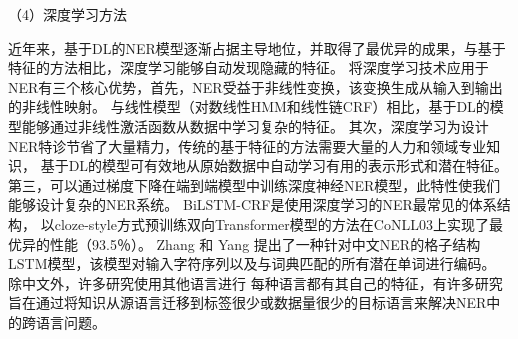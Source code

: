  （4）深度学习方法

 近年来，基于DL的NER模型逐渐占据主导地位，并取得了最优异的成果，与基于特征的方法相比，深度学习能够自动发现隐藏的特征。 
 将深度学习技术应用于NER有三个核心优势，首先，NER受益于非线性变换，该变换生成从输入到输出的非线性映射。
 与线性模型（对数线性HMM和线性链CRF）相比，基于DL的模型能够通过非线性激活函数从数据中学习复杂的特征。
 其次，深度学习为设计NER特诊节省了大量精力，传统的基于特征的方法需要大量的人力和领域专业知识，
 基于DL的模型可有效地从原始数据中自动学习有用的表示形式和潜在特征。
 第三，可以通过梯度下降在端到端模型中训练深度神经NER模型，此特性使我们能够设计复杂的NER系统。
 BiLSTM-CRF是使用深度学习的NER最常见的体系结构，
 以cloze-style方式预训练双向Transformer模型的方法在CoNLL03上实现了最优异的性能（93.5％）\cite{baevski2019cloze}。 
 Zhang 和 Yang 提出了一种针对中文NER的格子结构LSTM模型，该模型对输入字符序列以及与词典匹配的所有潜在单词进行编码\cite{zhang2018chinese}。
 除中文外，许多研究使用其他语言进行
 每种语言都有其自己的特征，有许多研究旨在通过将知识从源语言迁移到标签很少或数据量很少的目标语言来解决NER中的跨语言问题。




